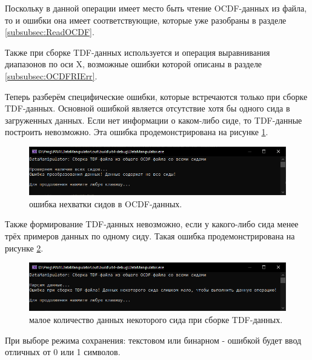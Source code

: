 {\standartFont

  \par Поскольку в данной операции имеет место быть чтение OCDF-данных из файла, то и ошибки она имеет соответствующие, которые уже разобраны в разделе \ref{subsubsec:ReadOCDF}.

  \par Также при сборке TDF-данных используется и операция выравнивания диапазонов по оси X, возможные ошибки которой описаны в разделе \ref{subsubsec:OCDFRIErr}.

  \par Теперь разберём специфические ошибки, которые встречаются только при сборке TDF-данных. Основной ошибкой является отсутствие хотя бы одного сида в загруженных данных. Если нет информации о каком-либо сиде, то TDF-данные построить невозможно. Эта ошибка продемонстрирована на рисунке \ref{fig:CreateTDFErr1}.

  \begin{figure}[H]
    \centering
    \includegraphics[width=\textwidth]{images/forDataManipulator/CreateTDFErr1.png}
    \caption{ошибка нехватки сидов в OCDF-данных.}
    \label{fig:CreateTDFErr1}
  \end{figure}

  \par Также формирование TDF-данных невозможно, если у какого-либо сида менее трёх примеров данных по одному сиду. Такая ошибка продемонстрирована на рисунке \ref{fig:CreateTDFErr2}.

  \begin{figure}[H]
    \centering
    \includegraphics[width=\textwidth]{images/forDataManipulator/CreateTDFErr2.png}
    \caption{малое количество данных некоторого сида при сборке TDF-данных.}
    \label{fig:CreateTDFErr2}
  \end{figure}

  \par При выборе режима сохранения: текстовом или бинарном - ошибкой будет ввод отличных от 0 или 1 символов.

  \par
}
